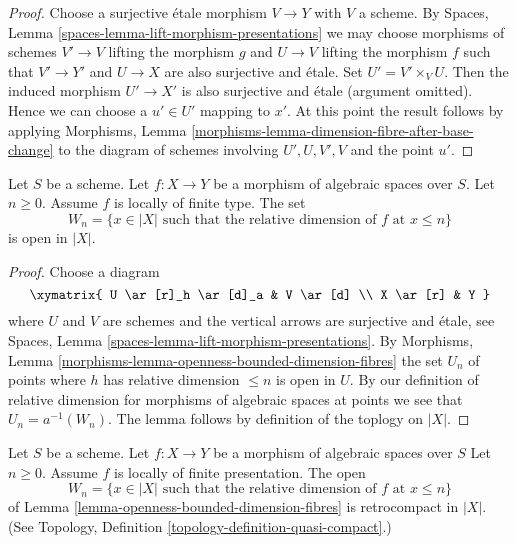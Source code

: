 \begin{proof}
Choose a surjective \'etale morphism $V \to Y$ with $V$ a scheme.
By
Spaces, Lemma \ref{spaces-lemma-lift-morphism-presentations}
we may choose morphisms of schemes $V' \to V$ lifting the morphism $g$ and
$U \to V$ lifting the morphism $f$ such that $V' \to Y'$
and $U \to X$ are also surjective and \'etale. Set $U' = V' \times_V U$.
Then the induced morphism $U' \to X'$ is also surjective and
\'etale (argument omitted). Hence we can choose a $u' \in U'$
mapping to $x'$. At this point the result follows by applying
Morphisms, Lemma \ref{morphisms-lemma-dimension-fibre-after-base-change}
to the diagram of schemes involving $U', U, V', V$ and the point $u'$.
\end{proof}

\begin{lemma}
\label{lemma-openness-bounded-dimension-fibres}
Let $S$ be a scheme.
Let $f : X \to Y$ be a morphism of algebraic spaces over $S$.
Let $n \geq 0$. Assume $f$ is locally of finite type.
The set
$$
W_n = \{x \in |X|
\text{ such that the relative dimension of }f\text{ at } x \leq n\}
$$
is open in $|X|$.
\end{lemma}

\begin{proof}
Choose a diagram
$$
\xymatrix{
U \ar[r]_h \ar[d]_a & V \ar[d] \\
X \ar[r] & Y
}
$$
where $U$ and $V$ are schemes and the vertical arrows are surjective and
\'etale, see
Spaces, Lemma \ref{spaces-lemma-lift-morphism-presentations}.
By
Morphisms, Lemma \ref{morphisms-lemma-openness-bounded-dimension-fibres}
the set $U_n$ of points where $h$ has relative dimension
$\leq n$ is open in $U$. By our definition of relative dimension
for morphisms of algebraic spaces at points we see that
$U_n = a^{-1}(W_n)$.
The lemma follows by definition of the toplogy on $|X|$.
\end{proof}

\begin{lemma}
\label{lemma-openness-bounded-dimension-fibres-finite-presentation}
Let $S$ be a scheme.
Let $f : X \to Y$ be a morphism of algebraic spaces over $S$
Let $n \geq 0$. Assume $f$ is locally of finite presentation.
The open
$$
W_n = \{x \in |X|
\text{ such that the relative dimension of }f\text{ at } x \leq n\}
$$
of Lemma \ref{lemma-openness-bounded-dimension-fibres}
is retrocompact in $|X|$. (See
Topology, Definition \ref{topology-definition-quasi-compact}.)
\end{lemma}

